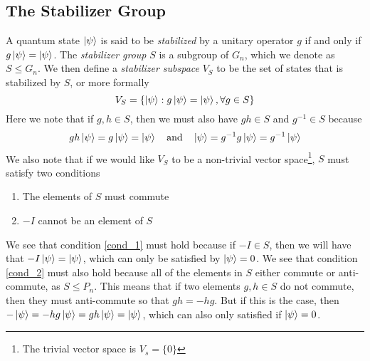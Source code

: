 \message{ !name(report_1.tex)}\documentclass[11pt]{article}
\theoremstyle{definition}
\theoremstyle{plain}
\begin{document}
\subsection{The Stabilizer Group}
A quantum state $\ket{\psi}$ is said to be \emph{stabilized} by a unitary operator $g$ if and only if $g \ket{\psi} = \ket{\psi}$. The \emph{stabilizer group} $S$ is a subgroup of $G_n$, which we denote as $S \leq G_n$. We then define a \emph{stabilizer subspace} $V_S$ to be the set of states that is stabilized by $S$, or more formally
\begin{equation}
  V_S = \left\{ \ket{\psi} : g \ket{\psi} = \ket{\psi} , \forall g \in S \right\}  
\end{equation}
Here we note that if $g, h \in S$, then we must also have $gh \in S$ and $g^{-1} \in S$ because
\begin{equation}\label{stab_1}
  gh \ket{\psi} = g \ket{\psi} = \ket{\psi} \quad \text{and} \quad
  \ket{\psi} = g^{-1} g \ket{\psi} = g^{-1} \ket{\psi}
\end{equation} 
We also note that if we would like $V_S$ to be a non-trivial vector space\footnote{The trivial vector space is $V_s = \{0 \}$}, $S$ must satisfy two conditions
\begin{enumerate}[label = (\arabic*)]
\item\label{cond_1} The elements of $S$ must commute
\item\label{cond_2} $-I$ cannot be an element of $S$ 
\end{enumerate} 
We see that condition {\ref{cond_1}} must hold because if $-I \in S$, then we will have that $-I \ket{\psi} = \ket{\psi}$, which can only be satisfied by $\ket{\psi} = 0$. We see that condition {\ref{cond_2}} must also hold because all of the elements in $S$ either commute or anti-commute, as $S \leq P_n$. This means that if two elements $g, h \in S$ do not commute, then they must anti-commute so that $gh = -hg$. But if this is the case, then $-\ket{\psi} = -hg \ket{\psi} = gh \ket{\psi} = \ket{\psi}$, which can also only satisfied if $\ket{\psi} = 0$.
\end{document}
